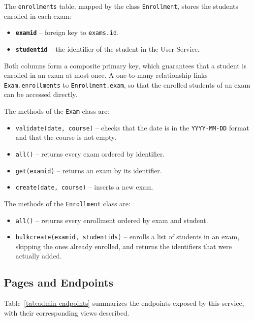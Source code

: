 \documentclass[letterpaper, 10 pt, conference]{ieeeconf}
\renewcommand{\_}{\textunderscore\allowbreak}
\begin{document}
The \texttt{enrollments} table, mapped by the class \texttt{Enrollment}, stores the students enrolled in each exam:
\begin{itemize}
    \item \textbf{\texttt{exam\_id}} -- foreign key to \texttt{exams.id}.
    \item \textbf{\texttt{student\_id}} -- the identifier of the student in the User Service.
\end{itemize}

Both columns form a composite primary key, which guarantees that a student is enrolled in an exam at most once. A one-to-many relationship links \texttt{Exam.enrollments} to \texttt{Enrollment.exam}, so that the enrolled students of an exam can be accessed directly.

The methods of the \texttt{Exam} class are:
\begin{itemize}
    \item \texttt{validate(date, course)} -- checks that the date is in the \texttt{YYYY-MM-DD} format and that the course is not empty.
    \item \texttt{all()} -- returns every exam ordered by identifier.
    \item \texttt{get(exam\_id)} -- returns an exam by its identifier.
    \item \texttt{create(date, course)} -- inserts a new exam.
\end{itemize}

The methods of the \texttt{Enrollment} class are:
\begin{itemize}
    \item \texttt{all()} -- returns every enrollment ordered by exam and student.
    \item \texttt{bulk\_create(exam\_id, student\_ids)} -- enrolls a list of students in an exam, skipping the ones already enrolled, and returns the identifiers that were actually added.
\end{itemize}

\subsection{Pages and Endpoints}

Table~\ref{tab:admin-endpoints} summarizes the endpoints exposed by this service, with their corresponding views described.
\end{document}
